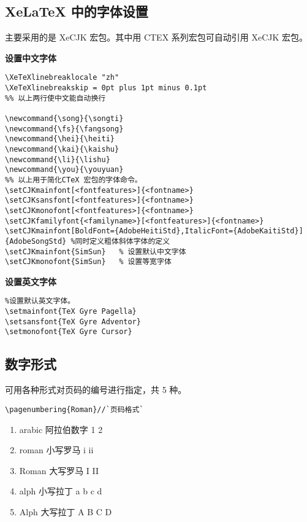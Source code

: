 \subsection{XeLaTeX 中的字体设置}
主要采用的是 XeCJK 宏包。其中用 CTEX 系列宏包可自动引用 XeCJK 宏包。

\textbf{设置中文字体}
\begin{lstlisting}[language={[LaTeX]TeX}]
\XeTeXlinebreaklocale "zh"
\XeTeXlinebreakskip = 0pt plus 1pt minus 0.1pt
%% 以上两行使中文能自动换行

\newcommand{\song}{\songti}
\newcommand{\fs}{\fangsong}
\newcommand{\hei}{\heiti}
\newcommand{\kai}{\kaishu}
\newcommand{\li}{\lishu}
\newcommand{\you}{\youyuan}
%% 以上用于简化CTeX 宏包的字体命令。
\setCJKmainfont[<fontfeatures>]{<fontname>}
\setCJKsansfont[<fontfeatures>]{<fontname>}
\setCJKmonofont[<fontfeatures>]{<fontname>}
\setCJKfamilyfont{<familyname>}[<fontfeatures>]{<fontname>}
\setCJKmainfont[BoldFont={AdobeHeitiStd},ItalicFont={AdobeKaitiStd}]
{AdobeSongStd} %同时定义粗体斜体字体的定义
\setCJKmainfont{SimSun}   % 设置默认中文字体
\setCJKmonofont{SimSun}   % 设置等宽字体

\end{lstlisting}


\textbf{设置英文字体}

\begin{lstlisting}[language={[LaTeX]TeX}]
%\setmainfont{Times New Roman}
%设置默认英文字体。
\setmainfont{TeX Gyre Pagella}
\setsansfont{TeX Gyre Adventor}
\setmonofont{TeX Gyre Cursor}
\end{lstlisting}
\subsection{数字形式}


可用各种形式对页码的编号进行指定，共 5 种。
\begin{lstlisting}[language={[LaTeX]TeX}]
\pagenumbering{Roman}//`页码格式`
\end{lstlisting}
\begin{enumerate}
  \item arabic 阿拉伯数字 1 2
  \item roman 小写罗马 i ii
  \item Roman 大写罗马 I II
  \item alph 小写拉丁 a b c d
  \item Alph 大写拉丁 A B C D
\end{enumerate}
